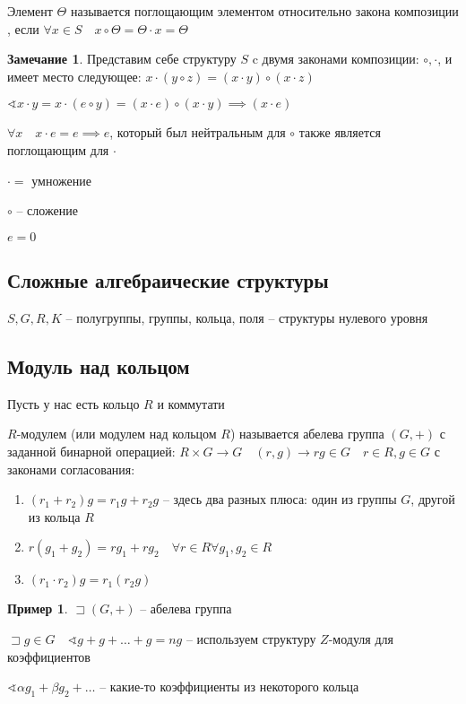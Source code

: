 \documentclass{book}
\theoremstyle{definition}
\newtheorem*{note}{Замечание}
\newtheorem*{example}{Пример}
\begin{document}
\begin{definition}
    Элемент $\Theta$ называется поглощающим элементом относительно закона композиции , если  $\forall x\in S\quad x\circ \Theta = \Theta\cdot x = \Theta$
\end{definition}

\begin{note}
    Представим себе структуру $S$ c двумя законами композиции: $\circ, \cdot $, и имеет место следующее: $x\cdot (y\circ z) = (x\cdot y)\circ (x\cdot z)$

    $\sphericalangle x\cdot  y = x\cdot (e\circ y) = (x\cdot e)\circ (x\cdot y) \implies  (x\cdot e)$

    $\forall x\quad x\cdot e = e\implies e$, который был нейтральным для $\circ $ также является поглощающим для $\cdot $ 

    $\cdot  = $ умножение

    $\circ$ -- сложение

     $e = 0$
\end{note}

\subsection{Сложные алгебраические структуры}

$S, G, R, K$ -- полугруппы, группы, кольца, поля -- структуры нулевого уровня

\subsection{Модуль над кольцом}

Пусть у нас есть кольцо $R$ и коммутати

 \begin{definition}
     $R$-модулем (или модулем над кольцом  $R$) называется абелева группа $(G, +)$ с заданной бинарной операцией:  $R\times G \to G\quad (r, g) \to  rg\in G\quad r\in R, g\in G$ с законами согласования:
     \begin{enumerate}
         \item $(r_1+r_2)g = r_1g+r_2g$ -- здесь два разных плюса: один из группы $G$, другой из кольца  $R$
         \item  $r(g_1+g_2) = rg_1 + rg_2\quad \forall r\in R\forall g_1, g_2\in R$
         \item $(r_1\cdot r_2)g = r_1(r_2g)$
     \end{enumerate}
\end{definition}
\begin{example}
    $\sqsupset (G, +)$ -- абелева группа

    $\sqsupset g\in G\quad \sphericalangle g+g+\ldots+g= ng$ -- используем структуру $Z$-модуля для коэффициентов 

     $\sphericalangle \alpha g_1+\beta g_2+\ldots$ -- какие-то коэффициенты из некоторого кольца
\end{example}
\end{document}
